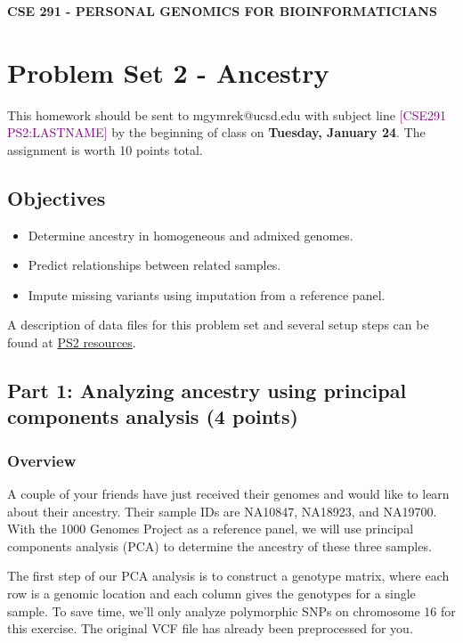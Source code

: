 \documentclass[12pt]{article}
\begin{document}
\textbf{CSE 291 - PERSONAL GENOMICS FOR BIOINFORMATICIANS}

\section*{Problem Set 2 - Ancestry}

This homework should be sent to mgymrek@ucsd.edu with subject line \textcolor{purple}{[CSE291 PS2:LASTNAME]} by the beginning of class on \textbf{Tuesday, January 24}. The assignment is worth 10 points total.

\subsection*{Objectives}
\begin{itemize}
\setlength\itemsep{0.0em}
\item Determine ancestry in homogeneous and admixed genomes.
\item Predict relationships between related samples.
\item Impute missing variants using imputation from a reference panel.
\end{itemize}

A description of data files for this problem set and several setup steps can be found at \href{https://gymreklab.github.io/teaching/personal\_genomics/ps2\_resources.html}{PS2 resources}. 

\subsection*{Part 1: Analyzing ancestry using principal components analysis (4 points)}

\subsubsection*{Overview}

A couple of your friends have just received their genomes and would like to learn about their ancestry. Their sample IDs are NA10847, NA18923, and NA19700. With the 1000 Genomes Project as a reference panel, we will use principal components analysis (PCA) to determine the ancestry of these three samples.

The first step of our PCA analysis is to construct a genotype matrix, where each row is a genomic location and each column gives the genotypes for a single sample. To save time, we'll only analyze polymorphic SNPs on chromosome 16 for this exercise. The original VCF file has already been preprocessed for you.
\end{document}
